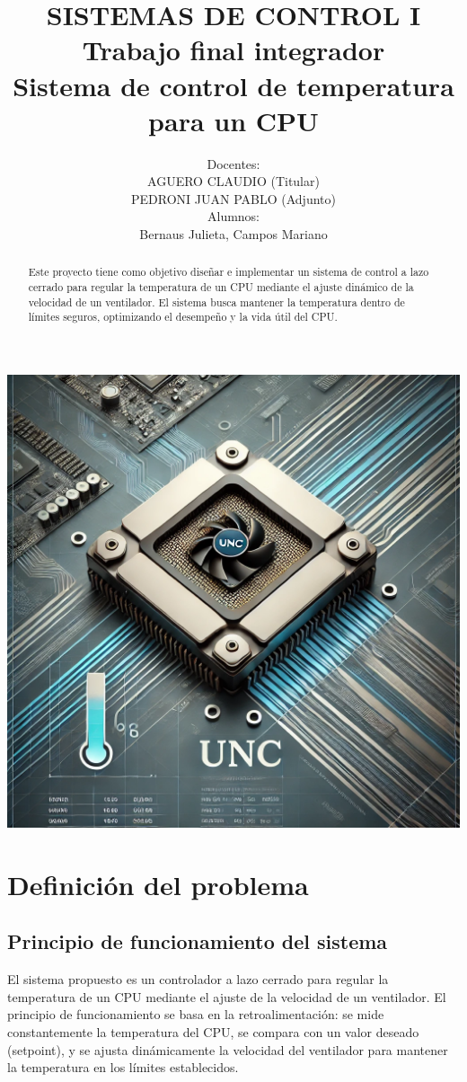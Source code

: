 \documentclass[12pt]{article}
\title{SISTEMAS DE CONTROL I \\ Trabajo final integrador 
	\\ Sistema de control de temperatura para un CPU}
\author{Docentes:\\ AGUERO CLAUDIO (Titular) \\ PEDRONI JUAN PABLO (Adjunto)
	\\ Alumnos: \\ Bernaus Julieta, Campos Mariano}
\begin{document}
	
\maketitle

\begin{center}
	\includegraphics[width=0.7\linewidth]{Imagenes/Informe}
\end{center}

\begin{abstract}
	Este proyecto tiene como objetivo diseñar e implementar un sistema de control a lazo cerrado para regular la temperatura de un CPU mediante el ajuste dinámico de la velocidad de un ventilador. El sistema busca mantener la temperatura dentro de límites seguros, optimizando el desempeño y la vida útil del CPU.
\end{abstract}\newpage

\tableofcontents \newpage

\section{Definición del problema}

	\subsection{Principio de funcionamiento del sistema}
	El sistema propuesto es un controlador a lazo cerrado para regular la temperatura de un CPU mediante el ajuste de la velocidad de un ventilador. El principio de funcionamiento se basa en la retroalimentación: se mide constantemente la temperatura del CPU, se compara con un valor deseado (setpoint), y se ajusta dinámicamente la velocidad del ventilador para mantener la temperatura en los límites establecidos.
\end{document}
